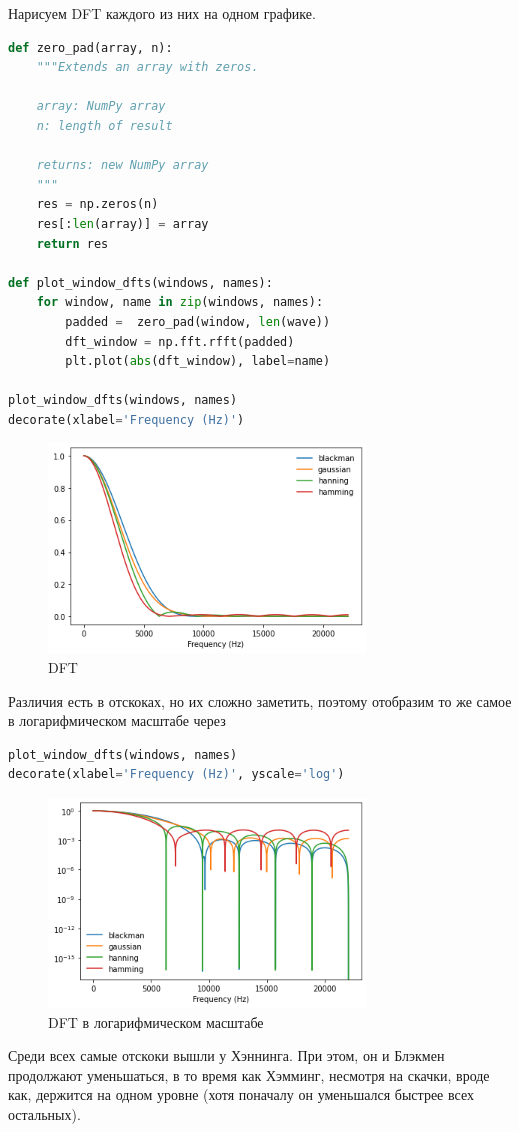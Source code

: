 \documentclass[a4paper,12pt]{report}
\begin{document}
    Нарисуем DFT каждого из них на одном графике.
    
\begin{lstlisting}[language=Python,caption=DFT]
def zero_pad(array, n):
    """Extends an array with zeros.

    array: NumPy array
    n: length of result

    returns: new NumPy array
    """
    res = np.zeros(n)
    res[:len(array)] = array
    return res

def plot_window_dfts(windows, names):
    for window, name in zip(windows, names):
        padded =  zero_pad(window, len(wave))
        dft_window = np.fft.rfft(padded)
        plt.plot(abs(dft_window), label=name)
        
plot_window_dfts(windows, names)
decorate(xlabel='Frequency (Hz)')
\end{lstlisting}

    \begin{figure}[H]
        \centering
        \includegraphics[width=0.75\textwidth]{images/ex3_linear.png}
        \caption{DFT}
        \label{fig:ex3_linear}
    \end{figure}

    Различия есть в отскоках, но их сложно заметить, поэтому отобразим то же самое в логарифмическом масштабе через 
    
\begin{lstlisting}[language=Python,caption=DFT в логарифмическом масштабе]
plot_window_dfts(windows, names)
decorate(xlabel='Frequency (Hz)', yscale='log')
\end{lstlisting}

    \begin{figure}[H]
        \centering
        \includegraphics[width=0.75\textwidth]{images/ex3_log.png}
        \caption{DFT в логарифмическом масштабе}
        \label{fig:ex3_log}
    \end{figure}
    
    Среди всех самые  отскоки вышли у Хэннинга. При этом, он и Блэкмен продолжают уменьшаться, в то время как Хэмминг, несмотря на скачки, вроде как, держится на одном уровне (хотя поначалу он уменьшался быстрее всех остальных).    
    
    
\end{document}

